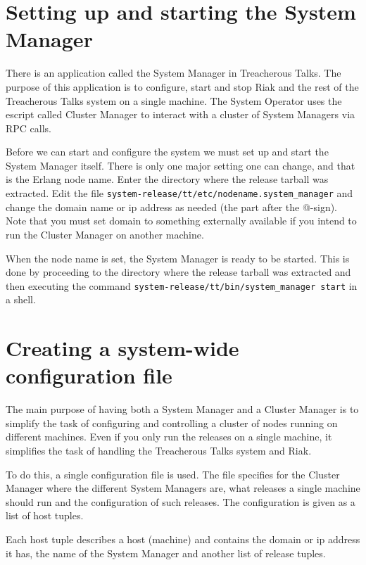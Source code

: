 \documentclass[11pt,a4paper]{report}
\begin{document}
\section{Setting up and starting the System Manager}
There is an application called the System Manager in Treacherous Talks. The
purpose of this application is to configure, start and stop Riak and the rest of
the Treacherous Talks system on a single machine. The System Operator uses the
escript called Cluster Manager to interact with a cluster of System Managers via
RPC calls.

\begin{sloppypar}
Before we can start and configure the system we must set up and start the System
Manager itself. There is only one major setting one can change, and that is the
Erlang node name. Enter the directory where the release tarball was extracted.
Edit the file {\tt system-release/tt/etc/nodename.system\_manager} and change
the domain name or ip address as needed (the part after the @-sign). Note that
you must set domain to something externally available if you intend to run the
Cluster Manager on another machine.
\end{sloppypar}

\begin{sloppypar}
When the node name is set, the System Manager is ready to be started. This is
done by proceeding to the directory where the release tarball was extracted and
then executing the command {\tt system-release/tt/bin/system\_manager start} in
a shell.
\end{sloppypar}
\section{Creating a system-wide configuration file}
The main purpose of having both a System Manager and a Cluster Manager is to
simplify the task of configuring and controlling a cluster of nodes running on
different machines. Even if you only run the releases on a single machine, it
simplifies the task of handling the Treacherous Talks system and Riak.

To do this, a single configuration file is used. The file specifies for the
Cluster Manager where the different System Managers are, what releases a single
machine should run and the configuration of such releases. The configuration is
given as a list of host tuples.

Each host tuple describes a host (machine) and contains the domain or ip address
it has, the name of the System Manager and another list of release tuples.
\end{document}
